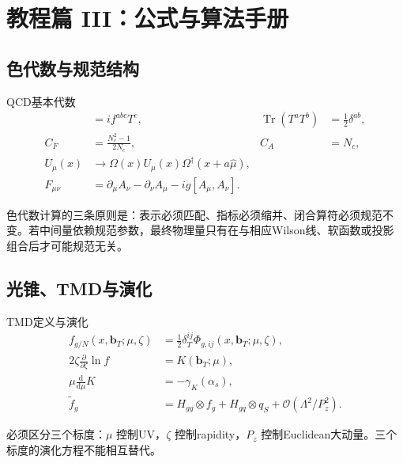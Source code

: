 \documentclass[UTF8,12pt,a4paper,twoside,openany]{ctexbook}
\newcommand{\dd}{\mathrm{d}}
\newcommand{\Tr}{\operatorname{Tr}}
\newcommand{\bT}{\boldsymbol b_T}
\begin{document}
\clearpage
\chapter{教程篇 III：公式与算法手册}
\label{sec:formula-algorithm-handbook}

\section{色代数与规范结构}

\begin{keyformula}{QCD基本代数}
\begin{align}
  [T^a,T^b]&=if^{abc}T^c,
  & \Tr(T^aT^b)&=\frac12\delta^{ab},
  \label{eq:handbook-color}\\
  C_F&=\frac{N_c^2-1}{2N_c},
  & C_A&=N_c,
  \label{eq:handbook-casimir}\\
  U_\mu(x)&\to\Omega(x)U_\mu(x)\Omega^\dagger(x+a\hat\mu),
  \label{eq:handbook-link}\\
  F_{\mu\nu}&=\partial_\mu A_\nu-\partial_\nu A_\mu-ig[A_\mu,A_\nu].
  \label{eq:handbook-fieldstrength}
\end{align}
\end{keyformula}

色代数计算的三条原则是：表示必须匹配、指标必须缩并、闭合算符必须规范不变。若中间量依赖规范参数，最终物理量只有在与相应Wilson线、软函数或投影组合后才可能规范无关。

\section{光锥、TMD与演化}

\begin{keyformula}{TMD定义与演化}
\begin{align}
  f_{g/N}(x,\bT;\mu,\zeta)
  &=\frac12\delta_T^{ij}\Phi_{g,ij}(x,\bT;\mu,\zeta),
  \label{eq:handbook-tmd}\\
  2\zeta\frac{\partial}{\partial\zeta}\ln f
  &=K(\bT;\mu),
  \label{eq:handbook-cs}\\
  \mu\frac{\dd}{\dd\mu}K
  &=-\gamma_K(\alpha_s),
  \label{eq:handbook-cs-rge}\\
  \widetilde f_g
  &=H_{gg}\otimes f_g+H_{gq}\otimes q_S
  +\mathcal O(\Lambda^2/P_z^2).
  \label{eq:handbook-matching}
\end{align}
\end{keyformula}

必须区分三个标度：\(\mu\) 控制UV，\(\zeta\) 控制rapidity，\(P_z\) 控制Euclidean大动量。三个标度的演化方程不能相互替代。
\end{document}
